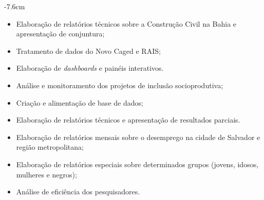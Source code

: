 \documentclass[10pt,a4paper]{curriculo}
\begin{document}
\tagline{}

\begin{adjustwidth}{}{-7.6cm}
\makecvheader
\end{adjustwidth}




\begin{itemize}
\item Elaboração de relatórios técnicos sobre a Construção Civil na Bahia e apresentação de conjuntura;
\item Tratamento de dados do Novo Caged e RAIS;
\item Elaboração de \textit{dashboards} e painéis interativos.
\end{itemize}

\divider

\begin{itemize}
\item Análise e monitoramento dos projetos de inclusão socioprodutiva;
\item Criação e alimentação de base de dados;
\item Elaboração de relatórios técnicos e apresentação de resultados parciais.
\end{itemize}

\divider

\begin{itemize}
	\item Elaboração de relatórios mensais sobre o desemprego na cidade de Salvador e região metropolitana;
	\item Elaboração de relatórios especiais sobre determinados grupos  (jovens, idosos, mulheres e negros);
	\item Análise de eficiência dos pesquisadores.
\end{itemize}
\end{document}
